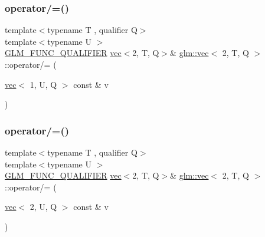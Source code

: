 \subsubsection{\texorpdfstring{operator/=()}{operator/=()}\hspace{0.1cm}{\footnotesize\ttfamily [5/6]}}
{\footnotesize\ttfamily template$<$typename T , qualifier Q$>$ \\
template$<$typename U $>$ \\
\mbox{\hyperlink{setup_8hpp_a33fdea6f91c5f834105f7415e2a64407}{G\+L\+M\+\_\+\+F\+U\+N\+C\+\_\+\+Q\+U\+A\+L\+I\+F\+I\+ER}} \mbox{\hyperlink{structglm_1_1vec}{vec}}$<$2, T, Q$>$\& \mbox{\hyperlink{structglm_1_1vec}{glm\+::vec}}$<$ 2, T, Q $>$\+::operator/= (\begin{DoxyParamCaption}\item[{\mbox{\hyperlink{structglm_1_1vec}{vec}}$<$ 1, U, Q $>$ const \&}]{v }\end{DoxyParamCaption})}

\mbox{\label{structglm_1_1vec_3_012_00_01_t_00_01_q_01_4_aad3c8d0a01f1f7b325d450ecd7641e55}} 
\subsubsection{\texorpdfstring{operator/=()}{operator/=()}\hspace{0.1cm}{\footnotesize\ttfamily [6/6]}}
{\footnotesize\ttfamily template$<$typename T , qualifier Q$>$ \\
template$<$typename U $>$ \\
\mbox{\hyperlink{setup_8hpp_a33fdea6f91c5f834105f7415e2a64407}{G\+L\+M\+\_\+\+F\+U\+N\+C\+\_\+\+Q\+U\+A\+L\+I\+F\+I\+ER}} \mbox{\hyperlink{structglm_1_1vec}{vec}}$<$2, T, Q$>$\& \mbox{\hyperlink{structglm_1_1vec}{glm\+::vec}}$<$ 2, T, Q $>$\+::operator/= (\begin{DoxyParamCaption}\item[{\mbox{\hyperlink{structglm_1_1vec}{vec}}$<$ 2, U, Q $>$ const \&}]{v }\end{DoxyParamCaption})}

\mbox{\label{structglm_1_1vec_3_012_00_01_t_00_01_q_01_4_ad7b07e1346a5e808343241891129d11e}} 

